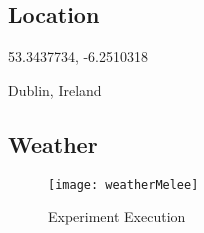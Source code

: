 \newpage
\FloatBarrier

\subsection{Location}
53.3437734, -6.2510318

Dublin, Ireland 

\FloatBarrier
\subsection{Weather}

\begin{figure}[ht]
\centering
\texttt{[image: weatherMelee]}
\caption{Experiment Execution}\label{weatherMelee}
\vspace{10 mm}
\end{figure}

\FloatBarrier